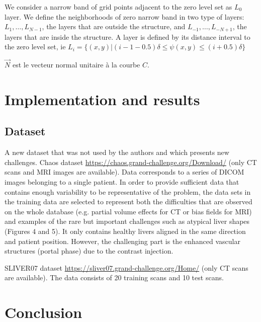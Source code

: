 \documentclass[a4paper, 11pt]{article}
\begin{document}
We consider a narrow band of grid points adjacent to the zero level set as $L_0$ layer. We define the neighborhoods of zero narrow band in two type of layers: $L_1, \dots, L_{N-1}$, the layers that are outside the structure, and $L_{-1}, \dots, L_{-N+1}$, the layers that are inside the structure. A layer is defined by its distance interval to the zero level set, ie 
$L_i = \lbrace (x, y) | (i-1 - 0.5)\delta \leq \psi(x, y) \leq (i + 0.5) \delta \rbrace$


$\overrightarrow{N}$ est le vecteur normal unitaire à la courbe $C$.
\section{Implementation and results}

\subsection{Dataset}
A new dataset that was not used by the authors and which presents new challenges. Chaos dataset \url{https://chaos.grand-challenge.org/Download/} (only CT scans and MRI images are available). Data corresponds to a series of DICOM images belonging to a single patient. In order to provide sufficient data that contains enough variability to be representative of the problem, the data sets in the training data are selected to represent both the difficulties that are observed on the whole database (e.g. partial volume effects for CT or bias fields for MRI) and examples of the rare but important challenges such as atypical liver shapes (Figures 4 and 5). It only contains healthy livers aligned in the same direction and patient position. However, the challenging part is the enhanced vascular structures (portal phase) due to the contrast injection. 

SLIVER07 dataset \url{https://sliver07.grand-challenge.org/Home/} (only CT scans are available). The data consists of 20 training scans and 10 test scans.
\section{Conclusion}

\printbibliography
\end{document}
